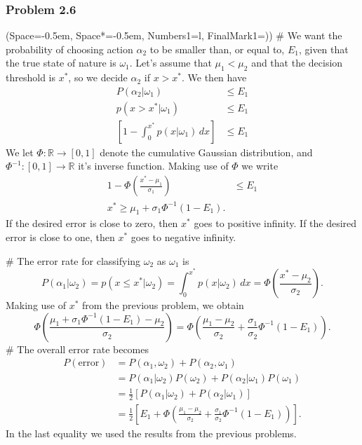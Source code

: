 \documentclass[12pt, a4paper]{article}
\newcommand{\listSpace}{-0.5em}%
\newcommand{\R}{\mathbb{R}}
\begin{document}
\subsubsection*{Problem 2.6}
\begin{easylist}[enumerate]
\ListProperties(Space=\listSpace, Space*=\listSpace, Numbers1=l, FinalMark1={)})
# We want the probability of choosing action $\alpha_2$ to be smaller than, or equal to, $E_1$, given that the true state of nature is $\omega_1$.
Let's assume that $\mu_1 < \mu_2$ and that the decision threshold is $x^*$, so we decide $\alpha_2$ if $x > x^*$.
We then have
\begin{align*}
	P(\alpha_2 | \omega_1) &\leq E_1 \\
	p(x > x^* | \omega_1) &\leq E_1 \\
	\left[1 - \int_{0}^{x^*} p(x | \omega_1)  \, dx \right] &\leq E_1
\end{align*}
We let $\Phi: \R \to \left[0, 1\right]$ denote the cumulative Gaussian distribution, and $\Phi^{-1}: \left[0, 1\right] \to \R$ it's inverse function.
Making use of $\Phi$ we write
\begin{align*}
1 - \Phi \left( \frac{x^* - \mu_1}{\sigma_1} \right) &\leq E_1 \\
x^* \geq \mu_1 + \sigma_1 \Phi^{-1} \left(1 - E_1 \right).
\end{align*}
If the desired error is close to zero, then $x^*$ goes to positive infinity.
If the desired error is close to one, then $x^*$ goes to negative infinity.

# The error rate for classifying $\omega_2$ as $\omega_1$ is
\begin{equation*}
	P(\alpha_1 | \omega_2) = 	p(x \leq x^* | \omega_2) = \int_{0}^{x^*} p(x| \omega_2) \, dx 
	= 
	\Phi \left(  \frac{x^* - \mu_2}{\sigma_2}  \right).
\end{equation*}
Making use of $x^*$ from the previous problem, we obtain
\begin{equation*}
 \Phi \left(  \frac{ \mu_1 + \sigma_1 \Phi^{-1} \left(1 - E_1 \right) - \mu_2}{\sigma_2}  \right) 
 =
\Phi \left(  \frac{\mu_1 - \mu_2}{\sigma_2} + \frac{\sigma_1}{\sigma_2}  \Phi^{-1} \left(1 - E_1 \right) \right).
\end{equation*}
# The overall error rate becomes
\begin{align*}
	P(\text{error}) &= P(\alpha_1, \omega_2) + P(\alpha_2, \omega_1) \\
	&= P(\alpha_1 | \omega_2) P(\omega_2) + P(\alpha_2| \omega_1) P(\omega_1) \\
	&= \frac{1}{2} \left[  P(\alpha_1 | \omega_2) +  P(\alpha_2| \omega_1) \right] \\
	&= \frac{1}{2} \left[ E_1 +  \Phi \left(  \frac{\mu_1 - \mu_2}{\sigma_2} + \frac{\sigma_1}{\sigma_2}  \Phi^{-1} \left(1 - E_1 \right) \right) \right].
\end{align*}
In the last equality we used the results from the previous problems.


\end{easylist}
\end{document}
